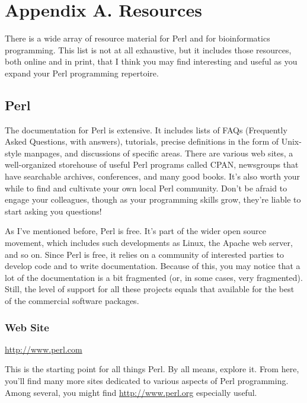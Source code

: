\chapter{Appendix A. Resources}
\label{chap:chapteraa}
\minitoc

There is a wide array of resource material for Perl and for bioinformatics programming. This list is not at all exhaustive, but it includes those resources, both online and in print, that I think you may find interesting and useful as you expand your Perl programming repertoire.

\section{Perl}
The documentation for Perl is extensive. It includes lists of FAQs (Frequently Asked Questions, with answers), tutorials, precise definitions in the form of Unix-style manpages, and discussions of specific areas. There are various web sites, a well-organized storehouse of useful Perl programs called CPAN, newsgroups that have searchable archives, conferences, and many good books. It's also worth your while to find and cultivate your own local Perl community. Don't be afraid to engage your colleagues, though as your programming skills grow, they're liable to start asking you questions!

As I've mentioned before, Perl is free. It's part of the wider open source movement, which includes such developments as Linux, the Apache web server, and so on. Since Perl is free, it relies on a community of interested parties to develop code and to write documentation. Because of this, you may notice that a lot of the documentation is a bit fragmented (or, in some cases, very fragmented). Still, the level of support for all these projects equals that available for the best of the commercial software packages.

\subsection{Web Site}
\href{http://www.perl.com}{http://www.perl.com}

\begin{adjustwidth}{1cm}{}
This is the starting point for all things Perl. By all means, explore it. From here, you'll find many more sites dedicated to various aspects of Perl programming. Among several, you might find \href{http://www.perl.org}{http://www.perl.org} especially useful.
\end{adjustwidth}

